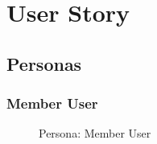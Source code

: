 \documentclass[12pt]{report}
\begin{document}
\tableofcontents
\clearpage

\chapter{User Story}
\section{Personas}

\FloatBarrier
\subsection{Member User}
\begin{figure}[!htb]
	\caption{\label{fig:member_user}Persona: Member User}
\end{figure}

\FloatBarrier
\end{document}
